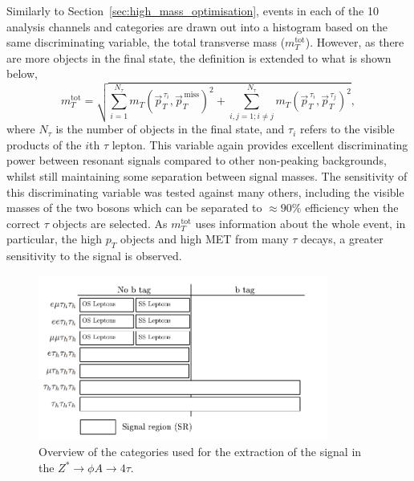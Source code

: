 Similarly to Section~\ref{sec:high_mass_optimisation}, events in each of the 10 analysis channels and categories are drawn out into a histogram based on the same discriminating variable, the total transverse mass ($m_{T}^{\text{tot
}}$).
However, as there are more objects in the final state, the definition is extended to what is shown below,
\begin{equation}
m_{T}^{\text{tot}} = \sqrt{ \sum_{i=1}^{N_\tau} m_{T}(\vec{p}_{T}^{\hspace{2pt}\tau_i},\vec{p}_{T}^{\hspace{2pt}\text{miss}})^2 + \sum_{i,j=1; i \neq j}^{N_\tau} m_{T}(\vec{p}_{T}^{\hspace{2pt}\tau_i},\vec{p}_{T}^{\hspace{2pt}\tau_j})^2 },  
\end{equation}
where $N_\tau$ is the number of objects in the final state, and $\tau_i$ refers to the visible products of the $i$th $\tau$ lepton.
This variable again provides excellent discriminating power between resonant signals compared to other non-peaking backgrounds, whilst still maintaining some separation between signal masses.
The sensitivity of this discriminating variable was tested against many others, including the visible masses of the two bosons which can be separated to $\approx 90\%$ efficiency when the correct $\tau$ objects are selected. 
As $m_{T}^{\text{tot}}$ uses information about the whole event, in particular, the high $p_{T}$ objects and high \ac{MET} from many $\tau$ decays, a greater sensitivity to the signal is observed. \\

\begin{figure}[t]
\centering
    \includegraphics[width=0.85\textwidth]{Figures/event-categories_4tau.pdf}
\caption[Diagram of the categories used to extract $Z^{*}\rightarrow \phi A \rightarrow 4\tau$.]{Overview of the categories used for the extraction of the signal in the $Z^{*}\rightarrow \phi A \rightarrow 4\tau$.}
\label{fig:4tau_categories}
\end{figure}

